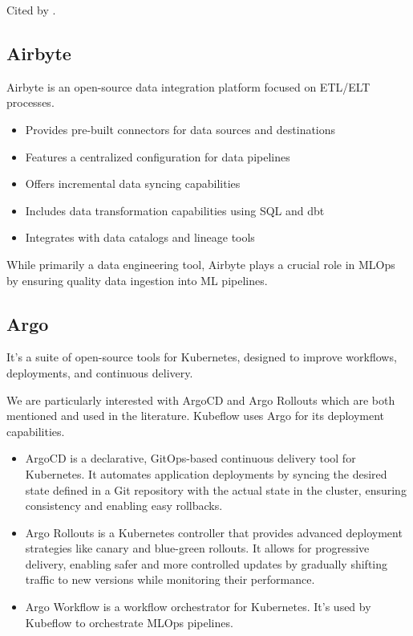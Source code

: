 Cited by \cite{mlflow}.

\subsection{Airbyte}
Airbyte is an open-source data integration platform focused on ETL/ELT processes\cite{airbyte}.

\begin{itemize}
\item Provides pre-built connectors for data sources and destinations
\item Features a centralized configuration for data pipelines
\item Offers incremental data syncing capabilities
\item Includes data transformation capabilities using SQL and dbt
\item Integrates with data catalogs and lineage tools
\end{itemize}

While primarily a data engineering tool, Airbyte plays a crucial role in MLOps by ensuring quality data ingestion into ML pipelines.

\subsection{Argo}\label{subsec:argo}\cite{argo}
It's a suite of open-source tools for Kubernetes, designed to improve workflows, deployments, and continuous delivery.

We are particularly interested with ArgoCD and Argo Rollouts which are both mentioned and used in the literature.
Kubeflow uses Argo for its deployment capabilities.

\begin{itemize}
    \item ArgoCD
     is a declarative, GitOps-based continuous delivery tool for Kubernetes.
     It automates application deployments by syncing the desired state
     defined in a Git repository with the actual state in the cluster,
     ensuring consistency and enabling easy rollbacks.

    \item Argo Rollouts
     is a Kubernetes controller that provides advanced deployment strategies
     like canary and blue-green rollouts.
     It allows for progressive delivery, enabling safer and more controlled updates by gradually
     shifting traffic to new versions while monitoring their performance.

    \item Argo Workflow
    is a workflow orchestrator for Kubernetes.
    It's used by Kubeflow to orchestrate MLOps pipelines.
\end{itemize}

